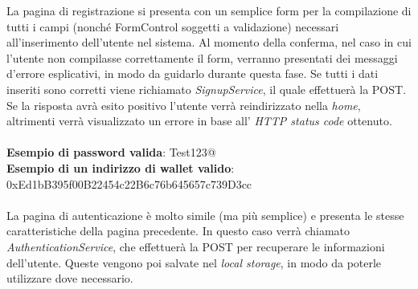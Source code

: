 \documentclass[11pt]{article}
\begin{document}
La pagina di registrazione si presenta con un semplice form per la compilazione di tutti i campi (nonché FormControl soggetti a validazione) necessari all'inserimento dell'utente nel sistema. Al momento della conferma, nel caso in cui l'utente non compilasse correttamente il form, verranno presentati dei messaggi d'errore esplicativi, in modo da guidarlo durante questa fase. Se tutti i dati inseriti sono corretti viene richiamato \textit{SignupService}, il quale effettuerà la POST. Se la risposta avrà esito positivo l'utente verrà reindirizzato nella \textit{home}, altrimenti verrà visualizzato un errore in base all' \textit{HTTP status code} ottenuto.\\
\\
\textbf{Esempio di password valida}: Test123@\\
\textbf{Esempio di un indirizzo di wallet valido}: 0xEd1bB395f00B22454c22B6c76b645657c739D3cc\\
\\
La pagina di autenticazione è molto simile (ma più semplice) e presenta le stesse caratteristiche della pagina precedente. In questo caso verrà chiamato \textit{AuthenticationService}, che effettuerà la POST per recuperare le informazioni dell'utente. Queste vengono poi salvate nel \textit{local storage}, in modo da poterle utilizzare dove necessario.
\end{document}
